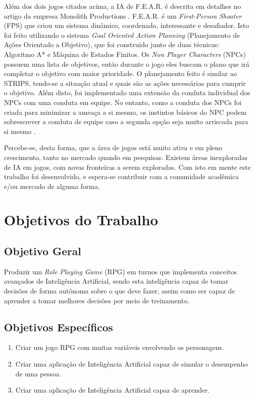 \documentclass[
	12pt,					%
	openright,				%
	oneside,				%
	a4paper,				%
	bibjustif,				%
	chapter=TITLE,			%
	english,				%
	brazil,					%
	]{abntex2}
\begin{document}
	Além dos dois jogos citados acima, a IA de F.E.A.R. é descrita em detalhes no artigo da empresa Monolith Productions \cite{fear}.
	F.E.A.R. é um \textit{First-Person Shooter} (FPS) que criou um sistema dinâmico, coordenado, interessante e desafiador.
	Isto foi feito utilizando o sistema \textit{Goal Oriented Action Planning} (Planejamento de Ações Orientado a Objetivo),
	que foi construído junto de duas técnicas: Algoritmo A* e Máquina de Estados Finitos.
	Os \textit{Non Player Characters} (NPCs) possuem uma lista de objetivos,
	então durante o jogo eles buscam o plano que irá completar o objetivo com maior prioridade.
	O planejamento feito é similar ao STRIPS,
	tendo-se a situação atual e quais são as ações necessárias para cumprir o objetivo.
	Além disto, foi implementado uma extensão da conduta individual dos NPCs
	com uma conduta em equipe.
	No entanto, como a conduta dos NPCs foi criada para minimizar a ameaça a si mesmo,
	os instintos básicos do NPC podem sobrescrever a conduta de equipe
	caso a segunda opção seja muito arriscada para si mesmo \cite{fear}.
	
	Percebe-se, desta forma, que a área de jogos está muito ativa e em pleno crescimento,
	tanto no mercado quando em pesquisas.
	Existem áreas inexploradas de IA em jogos,
	com novas fronteiras a serem exploradas.
	Com isto em mente este trabalho foi desenvolvido,
	e espera-se contribuir com a comunidade acadêmica e/ou mercado de alguma forma.

	\FloatBarrier
	\section{Objetivos do Trabalho}
	
		\FloatBarrier
		\subsection{Objetivo Geral}
			Produzir um \textit{Role Playing Game} (RPG) em turnos que implementa conceitos avançados de Inteligência Artificial,
			sendo esta inteligência capaz de tomar decisões de forma autônoma sobre o que deve fazer,
			assim como ser capaz de aprender a tomar melhores decisões por meio de treinamento.
		
		\FloatBarrier
		\subsection{Objetivos Específicos}
			\begin{enumerate}[noitemsep]
				\item Criar um jogo RPG com muitas variáveis envolvendo os personagens.
				\item Criar uma aplicação de Inteligência Artificial capaz de simular o desempenho de uma pessoa.
				\item Criar uma aplicação de Inteligência Artificial capaz de aprender.
			\end{enumerate}			
	
\end{document}
